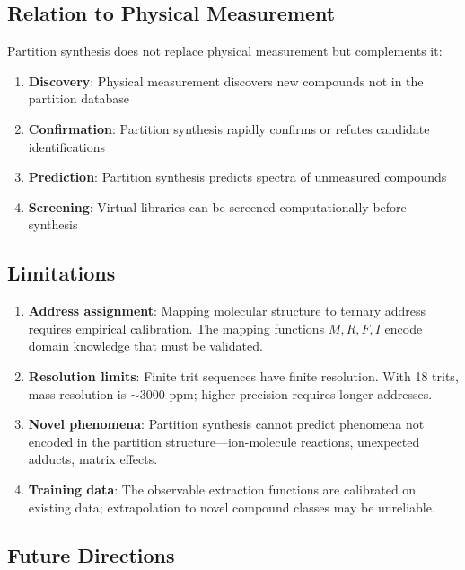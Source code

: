 \documentclass[twocolumn,10pt]{article}
\begin{document}
\subsection{Relation to Physical Measurement}

Partition synthesis does not replace physical measurement but complements it:

\begin{enumerate}[leftmargin=*]
\item \textbf{Discovery}: Physical measurement discovers new compounds not in the partition database
\item \textbf{Confirmation}: Partition synthesis rapidly confirms or refutes candidate identifications~\cite{duhrkop2019sirius, pluskal2010mzmine}
\item \textbf{Prediction}: Partition synthesis predicts spectra of unmeasured compounds
\item \textbf{Screening}: Virtual libraries can be screened computationally before synthesis~\cite{smith2006xcms, tsugawa2015msdial}
\end{enumerate}

\subsection{Limitations}

\begin{enumerate}[leftmargin=*]
\item \textbf{Address assignment}: Mapping molecular structure to ternary address requires empirical calibration. The mapping functions $M, R, F, I$ encode domain knowledge that must be validated.

\item \textbf{Resolution limits}: Finite trit sequences have finite resolution. With 18 trits, mass resolution is $\sim$3000 ppm; higher precision requires longer addresses.

\item \textbf{Novel phenomena}: Partition synthesis cannot predict phenomena not encoded in the partition structure---ion-molecule reactions, unexpected adducts, matrix effects.

\item \textbf{Training data}: The observable extraction functions are calibrated on existing data; extrapolation to novel compound classes may be unreliable.
\end{enumerate}

\subsection{Future Directions}
\end{document}
